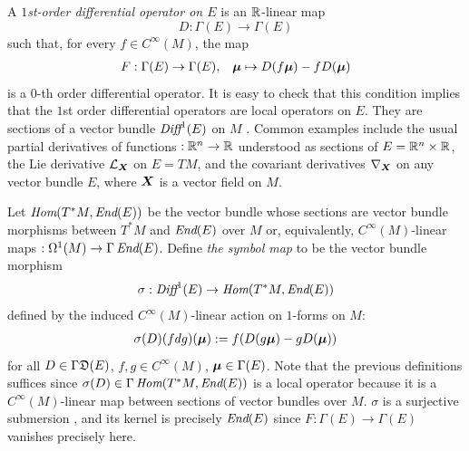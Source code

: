 A \emph{$1$st-order differential operator on $E$} is an $\mathbb{R}$-linear map 
\[
    D: \Gamma(E) \to \Gamma(E)
\]
such that, for every $f \in C^\infty(M)$, the map
\begin{align*}
    F: \Gamma(E) \to \Gamma(E), && \bm{\mu} \mapsto D(f \bm{\mu}) - f D(\bm{\mu})
\end{align*}
is a $0$-th order differential operator. It is easy to check that this condition implies that the $1$st order differential operators are local operators on $E$. They are sections of a vector bundle $\operatorname{\textit{Diff}}^1(E)$ on $M$ \cite{Mackenzie2005}%
. Common examples include the usual partial derivatives of functions $:\mathbb{R}^n \to \mathbb{R}$ understood as sections of $E = \mathbb{R}^n \times \mathbb{R}$, the Lie derivative $\mathcal L_{\bm{X}}$ on $E = TM$, and the covariant derivatives $\nabla_{\bm{X}}$ on any vector bundle $E$, where $\bm{X}$ is a vector field on $M$.

Let $\operatorname{\textit{Hom}}(T^*M, \operatorname{\textit{End}}(E))$ be the vector bundle whose sections are vector bundle morphisms between $T^* M$ and $\operatorname{\textit{End}}(E)$ over $M$ or, equivalently, $C^\infty(M)$-linear maps $:\Omega^1(M) \to \Gamma\operatorname{\textit{End}}(E)$. Define \emph{the symbol map} to be the vector bundle morphism
\begin{align*}
    \sigma: \operatorname{\textit{Diff}}^1(E) \to \operatorname{\textit{Hom}}(T^*M, \operatorname{\textit{End}}(E)) 
\end{align*}
defined by the induced $C^\infty(M)$-linear action on $1$-forms on $M$:
\begin{align*}
    \sigma(D)(fdg)(\bm{\mu}) := f (D(g \bm{\mu}) - g D(\bm{\mu}))
\end{align*}
for all $D \in \Gamma\mathfrak{D}(E)$, $f, g \in C^\infty(M)$, $\bm{\mu} \in \Gamma(E)$.
Note that the previous definitions suffices since $\sigma(D) \in \Gamma\operatorname{\textit{Hom}}(T^*M, \operatorname{\textit{End}}(E))$ is a local operator because it is a $C^\infty(M)$-linear map between sections of vector bundles over $M$. $\sigma$ is a surjective submersion \cite{Mackenzie2005}, and its kernel is precisely $\operatorname{\textit{End}}(E)$ since $F:\Gamma(E) \to \Gamma(E)$ vanishes precisely here.

